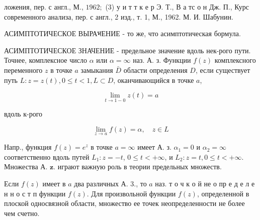 \documentclass[10pt]{article}
\begin{document}
ложения, пер. с англ., М., $1962 ;$ (3) у и т т к е р Э. Т., В а тс о н Дж. П., Курс современного анализа, пер. с англ., 2 изд., т. 1, М., 1962. М. И. Шабунин.



АСИМПТОТИЧЕСКОЕ ВЫРАभЕНИЕ - то же, что асимптотическая бормула.



АСИМПТОТИЧЕСКОЕ ЗНАЧЕНИЕ - предельное значение вдоль нек-рого пути. Точнее, комплексное число $\alpha$ или $\alpha=\infty$ наз. А. з. Функции $f(z)$ комплексного переменного $z$ в точке $a$ замыкания $\bar{D}$ области определения $D$, если существует путь $L: z=z(t), 0 \leqslant t<1, L \subset D$, оканчивающийся в точке $a$,



\[

\lim _{t \rightarrow 1-0} z(t)=a

\]



вдоль к-рого



\[

\lim _{z \rightarrow a} f(z)=\alpha, \quad z \in L

\]



Напр., функция $f(z)=e^{z}$ в точке $a=\infty$ имеет А. з. $\alpha_{1}=0$ и $\alpha_{2}=\infty$ соответственно вдоль путей $L_{1}: z=-t$, $0 \leqslant t<+\infty$, и $L_{2}: z=t, 0 \leqslant t<+\infty$. Множества А. $\mathbf{z}$. играют важную роль в теории предельных множеств.



Если $f(z)$ имеет в $a$ два различных А. 3., то $a$ наз. т о ч к о й не о пр е д е л е н н о с т п функции $f(z)$. Для произвольной функции $f(z)$, определенной в плоской односвязной области, множество ее точек неопределенности не более чем счетно.
\end{document}
